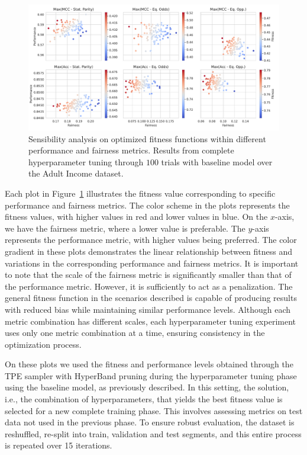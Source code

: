 \begin{figure}[!ht]
\centering
\caption{Sensibility analysis on optimized fitness functions within different performance and fairness metrics. Results from complete hyperparameter tuning through $100$ trials with baseline model over the Adult Income dataset.}
    \label{fig:fitness_sensibility}
    \includegraphics[width=1\linewidth]{images/fitness_sensibility.pdf}
\end{figure}

Each plot in Figure~\ref{fig:fitness_sensibility} illustrates the fitness value corresponding to specific performance and fairness metrics. The color scheme in the plots represents the fitness values, with higher values in red and lower values in blue. On the $x$-axis, we have the fairness metric, where a lower value is preferable. The $y$-axis represents the performance metric, with higher values being preferred. The color gradient in these plots demonstrates the linear relationship between fitness and variations in the corresponding performance and fairness metrics. It is important to note that the scale of the fairness metric is significantly smaller than that of the performance metric. However, it is sufficiently to act as a penalization. The general fitness function in the scenarios described is capable of producing results with reduced bias while maintaining similar performance levels. Although each metric combination has different scales, each hyperparameter tuning experiment uses only one metric combination at a time, ensuring consistency in the optimization process.

On these plots we used the fitness and performance levels obtained through the TPE sampler with HyperBand pruning during the hyperparameter tuning phase using the baseline model, as previously described. In this setting, the solution, i.e., the combination of hyperparameters, that yields the best fitness value is selected for a new complete training phase. This involves assessing metrics on test data not used in the previous phase. To ensure robust evaluation, the dataset is reshuffled, re-split into train, validation and test segments, and this entire process is repeated over 15 iterations.

